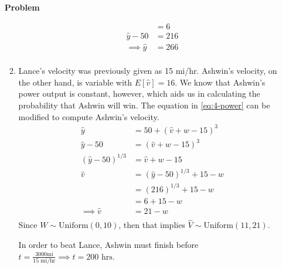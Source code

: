 \documentclass[12pt]{article}
\newenvironment{Ex}{\textbf{Problem}\vspace{.75em}\\}{}
\begin{document}
\begin{enumerate}
\begin{Ex}
\begin{solution}
\begin{enumerate}
\begin{equation}
\begin{aligned}
            &= 6 \\
            \hat{y} - 50 &= 216 \\
            \implies \hat{y} &= 266 \\
          \end{aligned}
        \end{equation}
      \item
        Lance's velocity was previously given as 15 mi/hr. Ashwin's
        velocity, on the other hand, is variable with $E[\hat{v}] =
        16$. We know that Ashwin's power output is constant, however,
        which aids us in calculating the probability that Ashwin will
        win. The equation in \cref{eq:4-power} can be modified to
        compute Ashwin's velocity.
        \begin{equation}
          \label{eq:4d-ashwins-velocity}
          \begin{aligned}
            \hat{y} &= 50 + (\hat{v}+w-15)^3 \\
            \hat{y} - 50 &= (\hat{v}+w-15)^3 \\
            (\hat{y} - 50)^{1/3} &= \hat{v}+w-15 \\
            \hat{v} &= (\hat{y} - 50)^{1/3} + 15 - w \\
            &= (216)^{1/3} + 15 - w \\
            &= 6+15-w \\
            \implies \hat{v} &= 21-w \\
          \end{aligned}
        \end{equation}
        Since $W\sim\text{Uniform}(0,10)$, then that implies
        $\hat{V}\sim\text{Uniform}(11,21)$.

        In order to beat Lance, Ashwin must finish before
        $t=\frac{3000\text{mi}}{15\text{ mi/hr}}
        \implies t=200\text{ hrs}$.


\end{enumerate}
\end{solution}
\end{Ex}
\end{enumerate}
\end{document}
